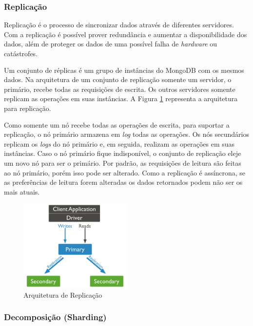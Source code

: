 \subsubsection{Replicação}

Replicação é o processo de sincronizar dados através de diferentes servidores. Com a replicação é possível prover redundância e aumentar a disponibilidade dos dados, além de proteger os dados de uma possível falha de \textit{hardware} ou catástrofes.

Um conjunto de réplicas é um grupo de instâncias do MongoDB com os mesmos dados. Na arquitetura de um conjunto de replicação somente um servidor, o primário, recebe todas as requisições de escrita. Os outros servidores somente replicam as operações em suas instâncias. A Figura \ref{fig:replication} representa a arquitetura para replicação.

Como somente um nó recebe todas as operações de escrita, para suportar a replicação, o nó primário armazena em \textit{log} todas as operações. Os nós secundários replicam os \textit{logs} do nó primário e, em seguida, realizam as operações em suas instâncias. Caso o nó primário fique indisponível, o conjunto de replicação eleje um novo nó para ser o primário. Por padrão, as requisições de leitura são feitas ao nó primário, porém isso pode ser alterado. Como a replicação é assíncrona, se as preferências de leitura forem alteradas os dados retornados podem não ser os mais atuais.

	\begin{figure}[!htbp]
		\begin{center}
			\includegraphics[width=0.5\textwidth]{replication}
		\end{center}
		\caption{Arquitetura de Replicação ~\cite{sitemongodb}}
		\label{fig:replication}
	\end{figure}


\subsubsection{Decomposição (Sharding)}

